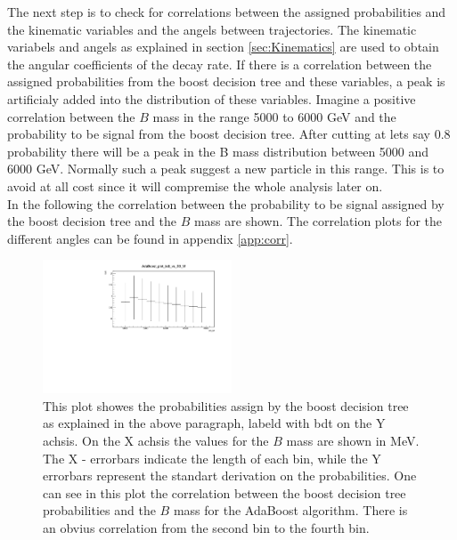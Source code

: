 \documentclass[english]{uzhpub}
\begin{document}
 The next step is to check for correlations between the assigned probabilities and the kinematic variables and the angels between trajectories. The kinematic variabels and angels as explained in section \ref{sec:Kinematics} are used to obtain the angular coefficients of the decay rate. If there is a correlation between the assigned probabilities from the boost decision tree and these variables, a peak is artificialy added into the distribution of these variables. Imagine a positive correlation between the $B$ mass in the range 5000 to 6000 GeV and the probability to be signal from the boost decision tree. After cutting at lets say 0.8 probability there will be a peak in the B mass distribution between 5000 and 6000 GeV. Normally such a peak suggest a new particle in this range. This is to avoid at all cost since it will compremise the whole analysis later on. \\
In the following the correlation between the probability to be signal assigned by the boost decision tree and the $B$ mass are shown. The correlation plots for the different angles can be found in appendix \ref{app:corr}.



 \begin{figure}[H]
  \centering
  \includegraphics[width=0.5\textwidth]{plots/AdaBoost_plot_bdt_vs_B0_M}
  \caption{This plot showes the probabilities assign by the boost decision tree as explained in the above paragraph, labeld with bdt on the Y achsis. On the X achsis the values for the $B$ mass are shown in MeV. The X - errorbars indicate the length of each bin, while the Y errorbars represent the standart derivation on the probabilities. One can see in this plot the correlation between the boost decision tree probabilities and the $B$ mass for the AdaBoost algorithm. There is an obvius correlation from the second bin to the fourth bin.}
  \label{fig:AdaB0M}
 \end{figure}
\end{document}
